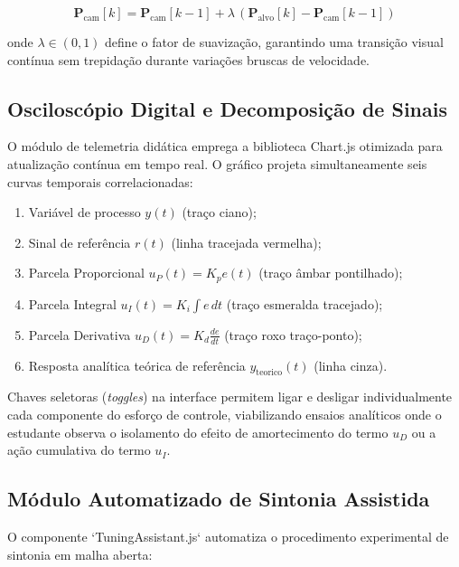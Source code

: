 \begin{equation}
    \mathbf{P}_{\text{cam}}[k] = \mathbf{P}_{\text{cam}}[k-1] + \lambda \, (\mathbf{P}_{\text{alvo}}[k] - \mathbf{P}_{\text{cam}}[k-1])
    \label{eq:lerp_camera}
\end{equation}

\noindent onde $\lambda \in (0, 1)$ define o fator de suavização, garantindo uma transição visual contínua sem trepidação durante variações bruscas de velocidade.

\subsection{Osciloscópio Digital e Decomposição de Sinais}
\label{subsec:osciloscopio_chart}

O módulo de telemetria didática emprega a biblioteca Chart.js otimizada para atualização contínua em tempo real. O gráfico projeta simultaneamente seis curvas temporais correlacionadas:

\begin{enumerate}
    \item Variável de processo $y(t)$ (traço ciano);
    \item Sinal de referência $r(t)$ (linha tracejada vermelha);
    \item Parcela Proporcional $u_P(t) = K_p e(t)$ (traço âmbar pontilhado);
    \item Parcela Integral $u_I(t) = K_i \int e \, dt$ (traço esmeralda tracejado);
    \item Parcela Derivativa $u_D(t) = K_d \frac{de}{dt}$ (traço roxo traço-ponto);
    \item Resposta analítica teórica de referência $y_{\text{teorico}}(t)$ (linha cinza).
\end{enumerate}

Chaves seletoras (\textit{toggles}) na interface permitem ligar e desligar individualmente cada componente do esforço de controle, viabilizando ensaios analíticos onde o estudante observa o isolamento do efeito de amortecimento do termo $u_D$ ou a ação cumulativa do termo $u_I$.

\subsection{Módulo Automatizado de Sintonia Assistida}
\label{subsec:modulo_sintonia}

O componente `TuningAssistant.js` automatiza o procedimento experimental de sintonia em malha aberta:


